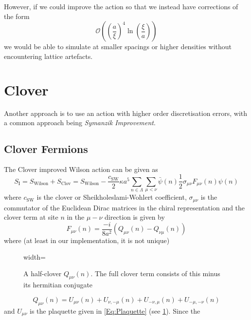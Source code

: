 	However, if we could improve the action so that we instead have corrections of the form
	\begin{equation}\label{Eq:Symanzik_Correction}
		\mathscr{O}\left(\left(\frac{a}{\xi}\right)^4\ln\left(\frac{\xi}{a}\right)\right)
	\end{equation}
	we would be able to simulate at smaller spacings or higher densities without encountering lattice artefacts.

\section{Clover}	
	Another approach is to use an action with higher order discretisation errors, with a common approach being
	\emph{Symanzik Improvement}.
\subsection{Clover Fermions}
	The Clover improved Wilson action can be given as
	\begin{equation}
		S_\text{I}=S_\text{Wilson}+S_\text{Clov}=S_\text{Wilson}
		-\frac{c_\text{SW}}{2} \kappa a^5 \sum\limits_{n\in\Lambda}\sum\limits_{\mu<\nu}
		\bar{\psi}(n)\frac{1}{2}\sigma_{\mu\nu}F_{\mu\nu}(n)\psi(n)
	\end{equation}
	where $c_\text{SW}$ is the clover or Sheikholeslami-Wohlert coefficient, $\sigma_{\mu\nu}$ is the commutator of the
	Euclidean Dirac matrices in the chiral representation and the clover term at site $n$ in the $\mu-\nu$ direction is
	given by
	\begin{equation}\label{Eq:Clover}
		F_{\mu\nu}(n)=\frac{-i}{8a^2}\left(Q_{\mu\nu}(n)-Q_{\nu\mu}(n)\right)
	\end{equation}
	where (at least in our implementation, it is not unique)
	\begin{figure}
		\centring
		\begin{adjustbox}{width=\linewidth}
		\end{adjustbox}
		\captionsetup{width=\linewidth}
		\caption{A half-clover $Q_{\mu\nu}(n)$. The full clover term consists of this minus its hermitian conjugate}
		\label{Tikz:Clover}
	\end{figure}
	\begin{equation}\label{Eq:Half Clover}
		Q_{\mu\nu}(n)=U_{\mu\nu}(n)+U_{\nu,-\mu}(n)+U_{-\nu,\mu}(n)+U_{-\mu,-\nu}(n)
	\end{equation}
	and $U_{\mu\nu}$ is the plaquette given in \cref{Eq:Plaquette} (see \cref{Tikz:Clover}). Since the
